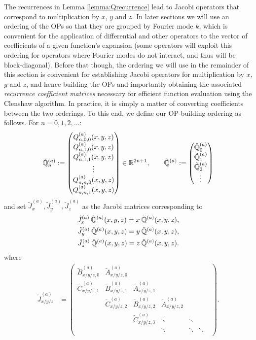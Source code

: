 \documentclass[11pt, oneside]{article}   	%
\begin{document}
The recurrences in Lemma \ref{lemma:Qrecurrence} lead to Jacobi operators that correspond to multiplication by $x$, $y$ and $z$. In later sections we will use an ordering of the OPs so that they are grouped by Fourier mode $k$, which is convenient for the application of differential and other operators to the vector of coefficients of a given function's expansion (some operators will exploit this ordering for operators where Fourier modes do not interact, and thus will be block-diagonal). Before that though, the ordering we will use in the remainder of this section is convenient for establishing Jacobi operators for multiplication by $x$, $y$ and $z$, and hence building the OPs and importantly obtaining the associated \textit{recurrence coefficient matrices} necessary for efficient function evaluation using the Clenshaw algorithm. In practice, it is simply a matter of converting coefficients between the two orderings. To this end, we define our OP-building ordering as follows. For $n=0,1,2,\dots$:
\begin{align*}
	\mathbb{\tilde{Q}}^{(a)}_{n} := 
		\begin{pmatrix}
			Q^{(a)}_{n,0,0}(x,y,z) \\
			Q^{(a)}_{n,1,0}(x,y,z) \\
			Q^{(a)}_{n,1,1}(x,y,z) \\
			\vdots \\
			Q^{(a)}_{n,n,0}(x,y,z) \\
			Q^{(a)}_{n,n,1}(x,y,z)
		\end{pmatrix} \in \mathbb{R}^{2n+1}, 
	\quad \quad 
	\mathbb{\tilde{Q}}^{(a)} := 
		\begin{pmatrix}
			\mathbb{\tilde{Q}}^{(a)}_0 \\
			\mathbb{\tilde{Q}}^{(a)}_1 \\
			\mathbb{\tilde{Q}}^{(a)}_2 \\
			\vdots \\
		\end{pmatrix}
\end{align*}
and set $\tilde J_x^{(a)}, \tilde J_y^{(a)}, \tilde J_z^{(a)}$ as the Jacobi matrices corresponding to
\begin{align}
	\tilde J_x^{(a)} \: \mathbb{\tilde{Q}}^{(a)}(x,y,z) = x \: \mathbb{\tilde{Q}}^{(a)}(x,y,z), \nonumber \\
	\tilde J_y^{(a)} \: \mathbb{\tilde{Q}}^{(a)}(x,y,z) = y \: \mathbb{\tilde{Q}}^{(a)}(x,y,z), \label{eqn:jacobimatricesdefinitionalt} \\
	\tilde J_z^{(a)} \: \mathbb{\tilde{Q}}^{(a)}(x,y,z) = z \: \mathbb{\tilde{Q}}^{(a)}(x,y,z). \nonumber
\end{align}
where
\begin{align*}
	\tilde J_{x/y/z}^{(a)} &= 
		\begin{pmatrix}
			\tilde B^{(a)}_{x/y/z, 0} & \tilde A^{(a)}_{x/y/z, 0} & & & & \\
			\tilde C^{(a)}_{x/y/z, 1} & \tilde B^{(a)}_{x/y/z, 1} & \tilde A^{(a)}_{x/y/z, 1} & & & \\
			& \tilde C^{(a)}_{x/y/z, 2} & \tilde B^{(a)}_{x/y/z, 2} & \tilde A^{(a)}_{x/y/z, 2} & & & \\
			& & \tilde C^{(a)}_{x/y/z, 3} & \ddots & \ddots & \\
			& & & \ddots & \ddots & \ddots \\
		\end{pmatrix}.
\end{align*}
\end{document}
